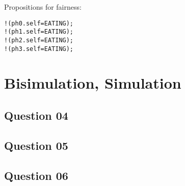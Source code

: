 \documentclass[a4paper]{article}
\begin{document}
Propositions for fairness:
\begin{lstlisting}
!(ph0.self=EATING);
!(ph1.self=EATING);
!(ph2.self=EATING);
!(ph3.self=EATING);
\end{lstlisting}

\section*{Bisimulation, Simulation}

\subsection*{Question 04}

\subsection*{Question 05}

\subsection*{Question 06}
\end{document}
